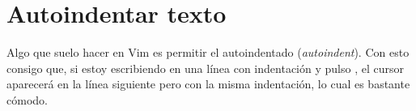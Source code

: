 \section{Autoindentar texto}\label{sec:vim-autoindent}
Algo que suelo hacer en Vim es permitir el autoindentado (\foreignlanguage{english}{\emph{autoindent}}). Con
esto consigo que, si estoy escribiendo en una línea con indentación y pulso , el cursor aparecerá
en la línea siguiente pero con la misma indentación, lo cual es bastante cómodo.

